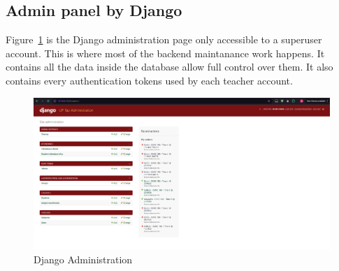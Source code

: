 \subsection{Admin panel by Django}
Figure~\ref{fig:admin} is the Django administration page only accessible to a superuser account. This is where most of the backend maintanance work happens. It contains all the data inside the database allow full control over them. It also contains every authentication tokens used by each teacher account.
\begin{figure}[h] %
	\centering
	\includegraphics[width=1\textwidth]{figures/chapter4/admin.png} %
	\caption{Django Administration}
	\label{fig:admin}
\end{figure}


